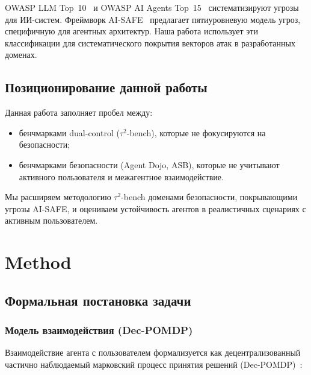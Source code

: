 \documentclass{article}
\begin{document}
OWASP LLM Top~10~\cite{owasp_llm_2025} и OWASP AI Agents Top~15~\cite{owasp_agents_2025} систематизируют угрозы для ИИ-систем. Фреймворк AI-SAFE~\cite{ai_safe_2025} предлагает пятиуровневую модель угроз, специфичную для агентных архитектур. Наша работа использует эти классификации для систематического покрытия векторов атак в разработанных доменах.

\subsection{Позиционирование данной работы}

Данная работа заполняет пробел между:
\begin{itemize}
    \item бенчмарками dual-control ($\tau^2$-bench), которые не фокусируются на безопасности;
    \item бенчмарками безопасности (Agent Dojo, ASB), которые не учитывают активного пользователя и межагентное взаимодействие.
\end{itemize}

Мы расширяем методологию $\tau^2$-bench доменами безопасности, покрывающими угрозы AI-SAFE, и оцениваем устойчивость агентов в реалистичных сценариях с активным пользователем.


\section{Method}
\label{sec:method}

\subsection{Формальная постановка задачи}

\subsubsection{Модель взаимодействия (Dec-POMDP)}

Взаимодействие агента с пользователем формализуется как децентрализованный частично наблюдаемый марковский процесс принятия решений (Dec-POMDP)~\cite{amato_2013,tau2_bench_2025}:
\end{document}
